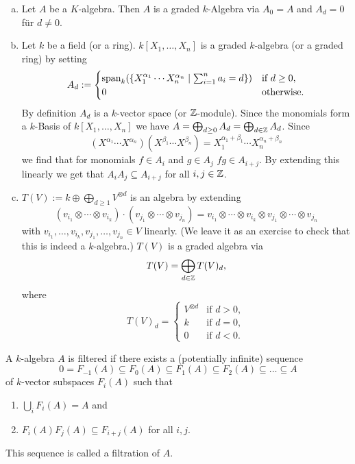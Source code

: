 \begin{expls}\leavevmode
 \begin{enumerate}[a)]
  \item
  Let $A$ be a $K$-algebra. Then $A$ is a graded $k$-Algebra via $A_0 = A$ and $A_d = 0$ für $d \neq 0$.
  
  \item
  Let $k$ be a field (or a ring). $k[X_1, \dotsc, X_n]$ is a graded $k$-algebra (or a graded ring) by setting
  \[
   A_d :=
   \begin{cases}
    \operatorname{span}_k(\{X_1^{\alpha_1} \dotsm X_n^{\alpha_n} \mid \sum_{i=1}^n a_i = d\}) & \text{if } d \geq 0, \\
    0                                                                            & \text{otherwise}.
   \end{cases}
  \]
  By definition $A_d$ is a $k$-vector space (or $\mathbb{Z}$-module). Since the monomials form a $k$-Basis of $k[X_1, \dotsc, X_n]$ we have $A = \bigoplus_{d \geq 0} A_d = \bigoplus_{d \in \mathbb{Z}} A_d$. Since
  \[
   \left( X^{\alpha_1} \dotsm X^{\alpha_n} \right) \left( X^{\beta_1} \dotsm X^{\beta_n} \right)
   = X_1^{\alpha_1+\beta_1} \dotsm X_n^{\alpha_n+\beta_n}
  \]
  we find that for monomials $f \in A_i$ and $g \in A_j$ $fg \in A_{i+j}$. By extending this linearly we get that $A_i A_j \subseteq A_{i+j}$ for all $i,j \in \mathbb{Z}$.
  
  
  \item
  $T(V) := k \oplus \bigoplus_{d \geq 1} V^{\otimes d}$ is an algebra by extending
  \[
   (v_{i_1} \otimes \dotsb \otimes v_{i_k}) \cdot (v_{j_1} \otimes \dotsb \otimes v_{j_n})
   = v_{i_1} \otimes \dotsb \otimes v_{i_k} \otimes v_{j_1} \otimes \dotsb \otimes v_{j_n}
  \]
  with $v_{i_1}, \dotsc, v_{i_k}, v_{j_1}, \dotsc, v_{j_n} \in V$ linearly. (We leave it as an exercise to check that this is indeed a $k$-algebra.) $T(V)$ is a graded algebra via
  \[
   T(V) = \bigoplus_{d \in \mathbb{Z}} T(V)_d,
  \]
  where
  \[
   T(V)_d =
   \begin{cases}
    V^{\otimes d} & \text{if } d > 0, \\
    k             & \text{if } d = 0, \\
    0             & \text{if } d < 0.
   \end{cases}
  \]
 \end{enumerate}
\end{expls}


\begin{defi}
 A $k$-algebra $A$ is filtered if there exists a (potentially infinite) sequence
 \[
  0 = F_{-1}(A) \subseteq F_0(A) \subseteq F_1(A) \subseteq F_2(A) \subseteq \dotsc \subseteq A
 \]
 of $k$-vector subspaces $F_i(A)$ such that
 \begin{enumerate}[1)]
  \item $\bigcup_i F_i(A) = A$ and
  \item $F_i(A) F_j(A) \subseteq F_{i+j}(A)$ for all $i,j$.
 \end{enumerate}
 This sequence is called a filtration of $A$.
\end{defi}



